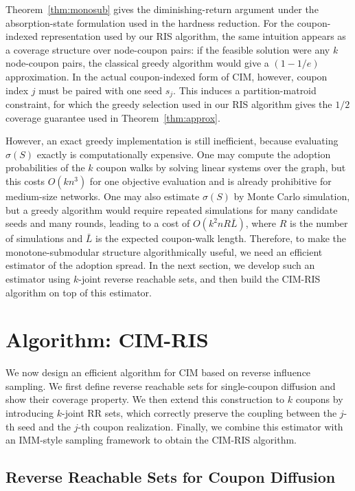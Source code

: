 \documentclass[sigconf]{acmart}
\newcommand{\CIMRIS}{\textsc{CIM-RIS}}
\begin{document}
Theorem~\ref{thm:monosub} gives the diminishing-return argument under
the absorption-state formulation used in the hardness reduction.
For the coupon-indexed representation used by our RIS algorithm, the
same intuition appears as a coverage structure over node-coupon pairs:
if the feasible solution were any $k$ node-coupon pairs, the classical
greedy algorithm would give a $(1{-}1/e)$ approximation.
In the actual coupon-indexed form of CIM, however, coupon index $j$ must
be paired with one seed $s_j$.
This induces a partition-matroid constraint, for which the greedy
selection used in our RIS algorithm gives the $1/2$ coverage guarantee
used in Theorem~\ref{thm:approx}.

However, an exact greedy implementation is still inefficient, because
evaluating $\sigma(S)$ exactly is computationally expensive.
One may compute the adoption probabilities of the $k$ coupon walks by
solving linear systems over the graph, but this costs $O(kn^3)$ for one
objective evaluation and is already prohibitive for medium-size
networks.
One may also estimate $\sigma(S)$ by Monte Carlo simulation, but a
greedy algorithm would require repeated simulations for many candidate
seeds and many rounds, leading to a cost of
$O(k^2 nR\bar{L})$, where $R$ is the number of simulations and
$\bar{L}$ is the expected coupon-walk length.
Therefore, to make the monotone-submodular structure algorithmically
useful, we need an efficient estimator of the adoption spread.
In the next section, we develop such an estimator using $k$-joint
reverse reachable sets, and then build the \CIMRIS{} algorithm on top of
this estimator.

\section{Algorithm: \CIMRIS{}}
\label{sec:algo}

We now design an efficient algorithm for CIM based on reverse
influence sampling.
We first define reverse reachable sets for single-coupon diffusion and
show their coverage property.
We then extend this construction to $k$ coupons by introducing
$k$-joint RR sets, which correctly preserve the coupling between the
$j$-th seed and the $j$-th coupon realization.
Finally, we combine this estimator with an IMM-style sampling framework
to obtain the \CIMRIS{} algorithm.

\subsection{Reverse Reachable Sets for Coupon Diffusion}
\end{document}
